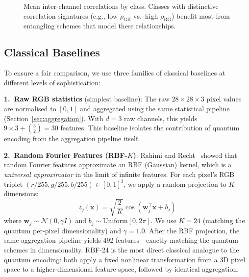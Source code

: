 \documentclass[conference,compsoc]{IEEEtran}
\begin{document}
\begin{figure}[t]
\centering
\caption{Mean inter-channel correlations by class. Classes with distinctive correlation signatures (e.g., low $\rho_\text{GB}$ vs.\ high $\rho_\text{RG}$) benefit most from entangling schemes that model these relationships.}
\label{fig:corr_stability}
\end{figure}

\subsection{Classical Baselines}
\label{sec:baselines}

To ensure a fair comparison, we use three families of classical baselines at different levels of sophistication:

\textbf{1.\ Raw RGB statistics} (simplest baseline): The raw $28 \times 28 \times 3$ pixel values are normalised to $[0,1]$ and aggregated using the same statistical pipeline (Section~\ref{sec:aggregation}).
With $d = 3$ raw channels, this yields $9 \times 3 + \binom{3}{2} = 30$ features.
This baseline isolates the contribution of quantum encoding from the aggregation pipeline itself.

\textbf{2.\ Random Fourier Features (RBF-$K$)}: Rahimi and Recht~\cite{rahimi2007random} showed that random Fourier features approximate an RBF (Gaussian) kernel, which is a \emph{universal approximator} in the limit of infinite features.
For each pixel's RGB triplet $(r/255, g/255, b/255) \in [0,1]^3$, we apply a random projection to $K$ dimensions:
\begin{equation}
    z_j(\mathbf{x}) = \sqrt{\frac{2}{K}} \cos(\mathbf{w}_j^\top \mathbf{x} + b_j)
\end{equation}
where $\mathbf{w}_j \sim \mathcal{N}(0, \gamma I)$ and $b_j \sim \text{Uniform}[0, 2\pi]$.
We use $K = 24$ (matching the quantum per-pixel dimensionality) and $\gamma = 1.0$.
After the RBF projection, the same aggregation pipeline yields 492 features---exactly matching the quantum schemes in dimensionality.
RBF-24 is the most direct classical analogue to the quantum encoding: both apply a fixed nonlinear transformation from a 3D pixel space to a higher-dimensional feature space, followed by identical aggregation.
\end{document}
